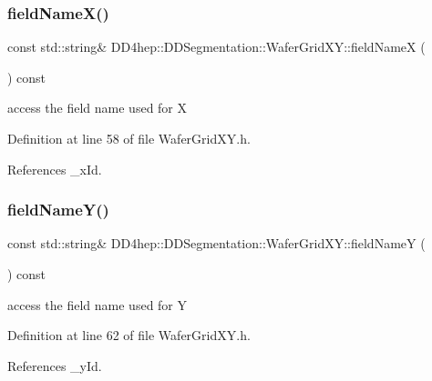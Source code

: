 \subsubsection{\texorpdfstring{field\+Name\+X()}{fieldNameX()}}
{\footnotesize\ttfamily const std\+::string\& D\+D4hep\+::\+D\+D\+Segmentation\+::\+Wafer\+Grid\+X\+Y\+::field\+NameX (\begin{DoxyParamCaption}{ }\end{DoxyParamCaption}) const\hspace{0.3cm}{\ttfamily [inline]}}



access the field name used for X 



Definition at line 58 of file Wafer\+Grid\+X\+Y.\+h.



References \+\_\+x\+Id.

\hypertarget{class_d_d4hep_1_1_d_d_segmentation_1_1_wafer_grid_x_y_a0d02a44320f03ddf68eae9e3bb84e4a6}{}\label{class_d_d4hep_1_1_d_d_segmentation_1_1_wafer_grid_x_y_a0d02a44320f03ddf68eae9e3bb84e4a6} 
\subsubsection{\texorpdfstring{field\+Name\+Y()}{fieldNameY()}}
{\footnotesize\ttfamily const std\+::string\& D\+D4hep\+::\+D\+D\+Segmentation\+::\+Wafer\+Grid\+X\+Y\+::field\+NameY (\begin{DoxyParamCaption}{ }\end{DoxyParamCaption}) const\hspace{0.3cm}{\ttfamily [inline]}}



access the field name used for Y 



Definition at line 62 of file Wafer\+Grid\+X\+Y.\+h.



References \+\_\+y\+Id.

\hypertarget{class_d_d4hep_1_1_d_d_segmentation_1_1_wafer_grid_x_y_ae0f9619846e0e1aac9554fdefad96721}{}\label{class_d_d4hep_1_1_d_d_segmentation_1_1_wafer_grid_x_y_ae0f9619846e0e1aac9554fdefad96721} 

